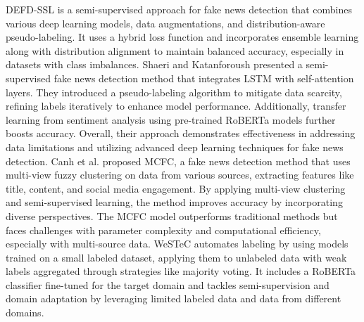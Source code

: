 DEFD-SSL \cite{al2023robust} is a semi-supervised approach for fake news detection that combines various deep learning models, data augmentations, and distribution-aware pseudo-labeling. It uses a hybrid loss function and incorporates ensemble learning along with distribution alignment to maintain balanced accuracy, especially in datasets with class imbalances.
Shaeri and Katanforoush \cite{shaeri2023semi} presented a semi-supervised fake news detection method that integrates LSTM with self-attention layers. They introduced a pseudo-labeling algorithm to mitigate data scarcity, refining labels iteratively to enhance model performance. Additionally, transfer learning from sentiment analysis using pre-trained RoBERTa models further boosts accuracy. Overall, their approach demonstrates effectiveness in addressing data limitations and utilizing advanced deep learning techniques for fake news detection.
Canh et al. \cite{canh2023fake} proposed MCFC, a fake news detection method that uses multi-view fuzzy clustering on data from various sources, extracting features like title, content, and social media engagement. By applying multi-view clustering and semi-supervised learning, the method improves accuracy by incorporating diverse perspectives. The MCFC model outperforms traditional methods but faces challenges with parameter complexity and computational efficiency, especially with multi-source data.
WeSTeC \cite{akdag2024early} automates labeling by using models trained on a small labeled dataset, applying them to unlabeled data with weak labels aggregated through strategies like majority voting. It includes a RoBERTa classifier fine-tuned for the target domain and tackles semi-supervision and domain adaptation by leveraging limited labeled data and data from different domains.

